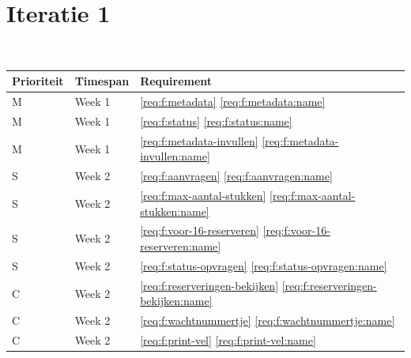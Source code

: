 \documentclass[a4paper,titlepage]{report}
\def\namedref#1{\ref{#1} \ref{#1:name}}
\begin{document}
  \section{Iteratie 1}
    \hfill\\
    \begin{tabular}{| p{} p{} p{} |}
      \hline
      \textbf{Prioriteit} & \textbf{Timespan} & \textbf{Requirement} \\
      \hline
      M & Week 1 & \namedref{req:f:metadata}\\ \hline
      M & Week 1 & \namedref{req:f:status}\\ \hline
      M & Week 1 & \namedref{req:f:metadata-invullen}\\ \hline
      S & Week 2 & \namedref{req:f:aanvragen}\\ \hline
      S & Week 2 & \namedref{req:f:max-aantal-stukken}\\ \hline
      S & Week 2 & \namedref{req:f:voor-16-reserveren}\\ \hline
      S & Week 2 & \namedref{req:f:status-opvragen}\\ \hline
      C & Week 2 & \namedref{req:f:reserveringen-bekijken}\\ \hline
      C & Week 2 & \namedref{req:f:wachtnummertje}\\ \hline
      C & Week 2 & \namedref{req:f:print-vel}\\ \hline
    \end{tabular}
\end{document}
